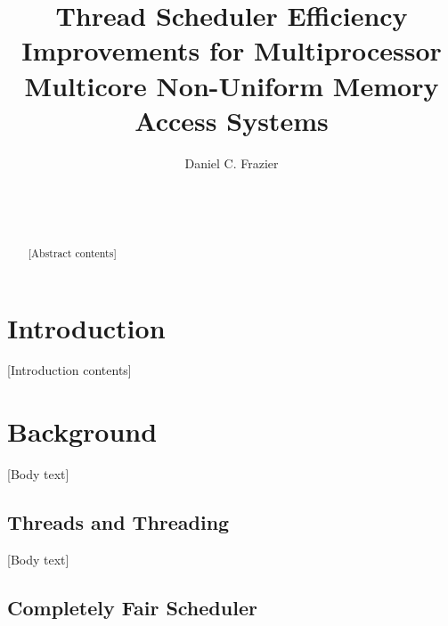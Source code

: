 \documentclass{sig-alternate}
\begin{document}

\title{Thread Scheduler Efficiency Improvements for Multiprocessor Multicore Non-Uniform Memory Access Systems}


\author{
\alignauthor
Daniel C. Frazier\\
	\\
	\\
	\\
}

\maketitle
\begin{abstract}
[Abstract contents]
\end{abstract}


\section{Introduction}
\label{sec:intro}

[Introduction contents]

\section{Background}
\label{sec:bg}

[Body text]

\subsection{Threads and Threading}
\label{sec:threads}

[Body text]

\subsection{Completely Fair Scheduler}
\label{sec:cfs}
\end{document}
